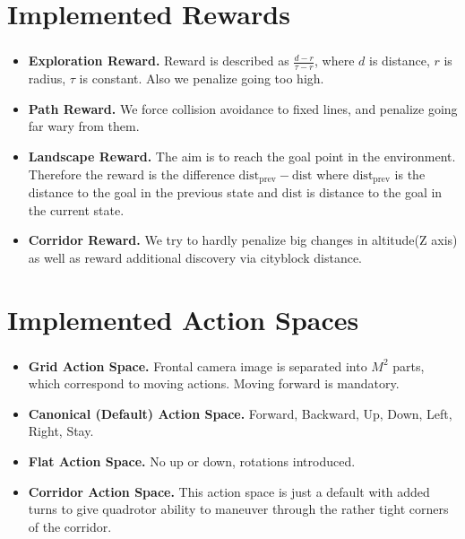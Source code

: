 \documentclass[t]{beamer}
\begin{document}
\section{Implemented Rewards}

\begin{frame}
	\frametitle{\insertsection}
	\begin{itemize}
    \item {\bf Exploration Reward.} Reward is described as $\frac{d - r}{\tau - r}$, where $d$ is distance, $r$ is radius, $\tau$ is constant.
        Also we penalize going too high.
    \item {\bf Path Reward.} We force collision avoidance to fixed lines, and penalize going far wary from them.
    \item {\bf Landscape Reward.} The aim is to reach the goal point in the environment. Therefore the reward is the difference $\text{dist}_{\text{prev}} - \text{dist}$ where $\text{dist}_{\text{prev}}$ is the distance to the goal in the previous state and $\text{dist}$ is distance to the goal in the current state.
    \item {\bf Corridor Reward.} We try to hardly penalize big changes in altitude(Z axis) as well as reward additional discovery via cityblock distance.
\end{itemize}
\end{frame}

\section{Implemented Action Spaces}

\begin{frame}
	\frametitle{\insertsection}
	\begin{itemize}
	    \item {\bf Grid Action Space.} Frontal camera image is separated into $M^2$ parts, which correspond to moving actions. Moving forward is
	        mandatory.
	    \item {\bf Canonical (Default) Action Space.} Forward, Backward, Up, Down, Left, Right, Stay.
	    \item {\bf Flat Action Space.} No up or down, rotations introduced.
	    \item {\bf Corridor Action Space.} This action space is just a default with added turns to give quadrotor ability to maneuver through the rather tight corners of the corridor.
	\end{itemize}
\end{frame}
\end{document}
